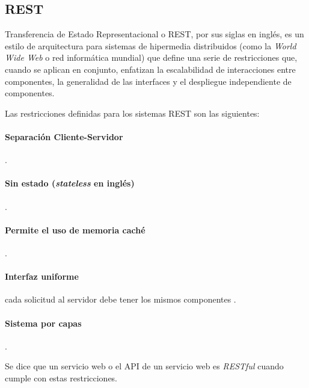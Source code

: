 \subsection{REST}
Transferencia de Estado Representacional o REST, por sus siglas en inglés, es un estilo de arquitectura para sistemas de hipermedia distribuidos (como la \textit{World Wide Web} o red informática mundial) que define una serie de restricciones que, cuando se aplican en conjunto, enfatizan la escalabilidad de interacciones entre componentes, la generalidad de las interfaces y el despliegue independiente de componentes. \cite{restFielding}

Las restricciones definidas para los sistemas REST son las siguientes:

\paragraph{Separación Cliente-Servidor} .
\paragraph{Sin estado (\emph{stateless} en inglés)} .
\paragraph{Permite el uso de memoria caché} .
\paragraph{Interfaz uniforme} cada solicitud al servidor debe tener los mismos componentes .
\paragraph{Sistema por capas} .

Se dice que un servicio web o el API de un servicio web es \textit{RESTful} cuando cumple con estas restricciones.